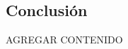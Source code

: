 \documentclass[preprint,12pt]{elsarticle}
\begin{document}
\subsection{Conclusión }	
AGREGAR CONTENIDO


	
	

	
	\newpage
	
		 

    

	
\end{document}
